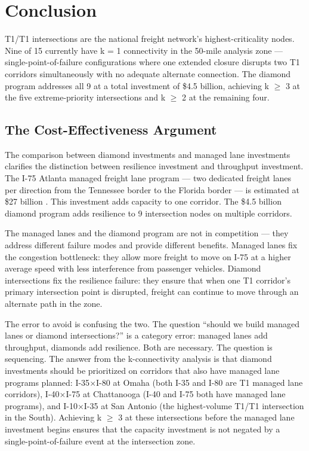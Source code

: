 \section{Conclusion}

T1/T1 intersections are the national freight network's highest-criticality nodes. Nine of 15 currently have k = 1 connectivity in the 50-mile analysis zone --- single-point-of-failure configurations where one extended closure disrupts two T1 corridors simultaneously with no adequate alternate connection. The diamond program addresses all 9 at a total investment of \$4.5 billion, achieving k $\geq$ 3 at the five extreme-priority intersections and k $\geq$ 2 at the remaining four.

\subsection*{The Cost-Effectiveness Argument}

The comparison between diamond investments and managed lane investments clarifies the distinction between resilience investment and throughput investment. The I-75 Atlanta managed freight lane program --- two dedicated freight lanes per direction from the Tennessee border to the Florida border --- is estimated at \$27 billion \citep{ROUTE_E1}. This investment adds capacity to one corridor. The \$4.5 billion diamond program adds resilience to 9 intersection nodes on multiple corridors.

The managed lanes and the diamond program are not in competition --- they address different failure modes and provide different benefits. Managed lanes fix the congestion bottleneck: they allow more freight to move on I-75 at a higher average speed with less interference from passenger vehicles. Diamond intersections fix the resilience failure: they ensure that when one T1 corridor's primary intersection point is disrupted, freight can continue to move through an alternate path in the zone.

The error to avoid is confusing the two. The question ``should we build managed lanes or diamond intersections?'' is a category error: managed lanes add throughput, diamonds add resilience. Both are necessary. The question is sequencing. The answer from the k-connectivity analysis is that diamond investments should be prioritized on corridors that also have managed lane programs planned: I-35$\times$I-80 at Omaha (both I-35 and I-80 are T1 managed lane corridors), I-40$\times$I-75 at Chattanooga (I-40 and I-75 both have managed lane programs), and I-10$\times$I-35 at San Antonio (the highest-volume T1/T1 intersection in the South). Achieving k $\geq$ 3 at these intersections before the managed lane investment begins ensures that the capacity investment is not negated by a single-point-of-failure event at the intersection zone.

